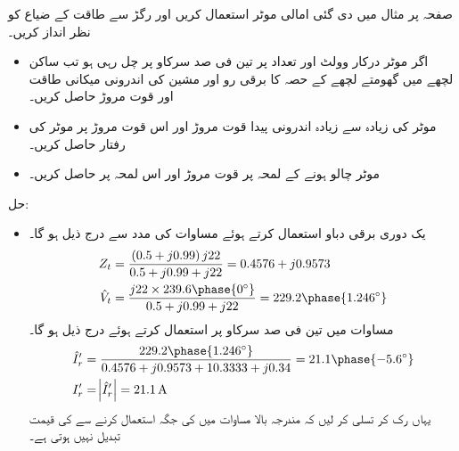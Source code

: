 صفحہ  پر مثال   میں دی گئی امالی موٹر استعمال کریں اور رگڑ سے طاقت کے ضیاع کو نظر انداز کریں۔
\begin{itemize}
\item
اگر موٹر درکار وولٹ اور تعداد  پر تین فی صد سرکاو پر چل رہی ہو تب  ساکن لچھے میں گھومتے لچھے کے حصہ کا برقی رو  اور مشین کی اندرونی میکانی طاقت اور قوت مروڑ حاصل کریں۔
\item
موٹر کی زیادہ سے زیادہ اندرونی پیدا قوت مروڑ اور اس قوت مروڑ پر موٹر کی رفتار حاصل کریں۔
\item
موٹر چالو ہونے کے لمحہ پر قوت مروڑ اور اس لمحہ پر   حاصل کریں۔ 
\end{itemize}

حل:
\begin{itemize}
\item
 یک دوری  برقی دباو   استعمال کرتے ہوئے مساوات   کی مدد سے درج ذیل ہو گا۔
\begin{align*}
Z_t&=\frac{\left(0.5+j 0.99 \right) j 22}{0.5+j 0.99+j 22}=0.4576+j 0.9573\\
\hat{V}_t&=\frac{j 22 \times 239.6 \phase{0^{\circ}}}{0.5+j 0.99+j 22}=229.2\phase{1.246^{\circ}}
\end{align*}
مساوات   میں  تین فی صد سرکاو پر   استعمال کرتے ہوئے درج ذیل ہو گا۔
\begin{align*}
\hat{I}_r'&=\frac{229.2 \phase{1.246^{\circ}}}{0.4576+j 0.9573+10.3333+j 0.34}=21.1\phase{-5.6^{\circ}}\\
I_r'&=\abs{\hat{I}_r'}=\SI{21.1}{\ampere}
\end{align*}
یہاں رک کر تسلی کر لیں کہ مندرجہ بالا مساوات میں  کی جگہ  استعمال کرنے سے  کی  قیمت تبدیل نہیں ہوتی ہے۔


\end{itemize}
